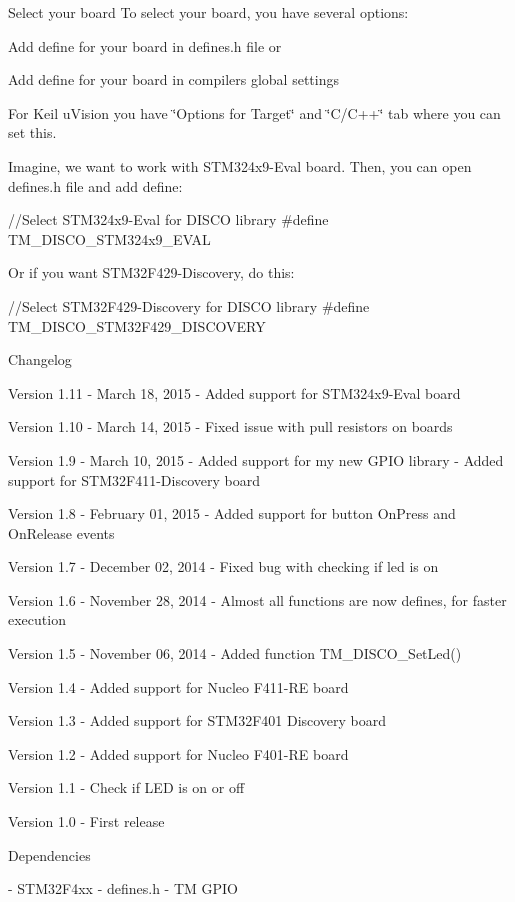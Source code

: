 \begin{DoxyParagraph}{Select your board}
To select your board, you have several options\+:
\begin{DoxyItemize}
\item Add define for your board in defines.\+h file or
\item Add define for your board in compiler\textquotesingle{}s global settings
\begin{DoxyItemize}
\item For Keil u\+Vision you have \char`\"{}\+Options for Target\char`\"{} and \char`\"{}\+C/\+C++\char`\"{} tab where you can set this.
\end{DoxyItemize}
\end{DoxyItemize}
\end{DoxyParagraph}
Imagine, we want to work with S\+T\+M324x9-\/\+Eval board. Then, you can open {\ttfamily defines.\+h} file and add define\+: \begin{DoxyVerb}//Select STM324x9-Eval for DISCO library
#define TM_DISCO_STM324x9_EVAL
\end{DoxyVerb}
 Or if you want S\+T\+M32\+F429-\/\+Discovery, do this\+: \begin{DoxyVerb}//Select STM32F429-Discovery for DISCO library
#define TM_DISCO_STM32F429_DISCOVERY
\end{DoxyVerb}


\begin{DoxyParagraph}{Changelog}

\end{DoxyParagraph}
\begin{DoxyVerb} Version 1.11
  - March 18, 2015
  - Added support for STM324x9-Eval board
  
 Version 1.10
  - March 14, 2015
  - Fixed issue with pull resistors on boards

 Version 1.9
  - March 10, 2015
  - Added support for my new GPIO library
  - Added support for STM32F411-Discovery board

 Version 1.8
  - February 01, 2015
  - Added support for button OnPress and OnRelease events
 
 Version 1.7
  - December 02, 2014
  - Fixed bug with checking if led is on
 
 Version 1.6
  - November 28, 2014
  - Almost all functions are now defines, for faster execution      
 
 Version 1.5
  - November 06, 2014
  - Added function TM_DISCO_SetLed()
 
 Version 1.4
  - Added support for Nucleo F411-RE board
 
 Version 1.3
  - Added support for STM32F401 Discovery board
 
 Version 1.2
  - Added support for Nucleo F401-RE board
    
 Version 1.1
  - Check if LED is on or off

 Version 1.0
  - First release
\end{DoxyVerb}


\begin{DoxyParagraph}{Dependencies}

\end{DoxyParagraph}
\begin{DoxyVerb} - STM32F4xx
 - defines.h
 - TM GPIO
\end{DoxyVerb}
 